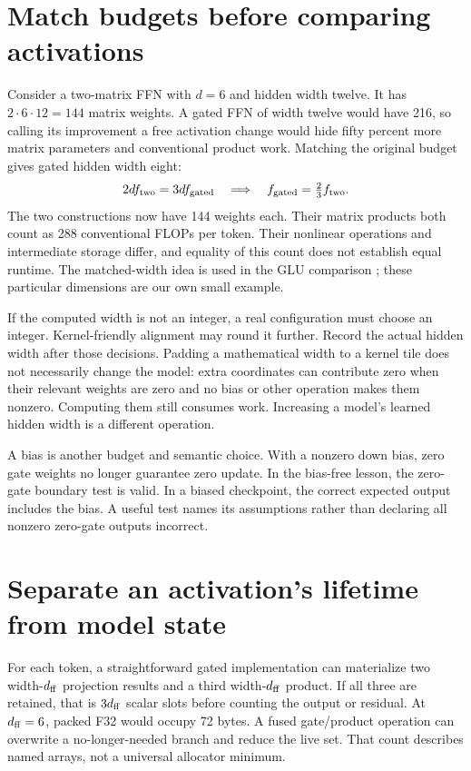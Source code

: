 \section{Match budgets before comparing activations}
Consider a two-matrix FFN with $d=6$ and hidden width twelve. It has
$2\cdot6\cdot12=144$ matrix weights. A gated FFN of width twelve
would have 216, so calling its improvement a free activation change would
hide fifty percent more matrix parameters and conventional product work.
Matching the original budget gives gated hidden width eight:
\[
 2d f_{\rm two}=3d f_{\rm gated}
 \quad\Longrightarrow\quad
 f_{\rm gated}=\tfrac23 f_{\rm two}.
\]
The two constructions now have 144 weights each. Their matrix products
both count as 288 conventional FLOPs per token. Their nonlinear
operations and intermediate storage differ, and equality of this count
does not establish equal runtime. The matched-width idea is used in the
GLU comparison \cite{shazeer2020glu}; these particular dimensions are
our own small example.

If the computed width is not an integer, a real configuration must choose
an integer. Kernel-friendly alignment may round it further. Record the
actual hidden width after those decisions. Padding a mathematical width
to a kernel tile does not necessarily change the model: extra coordinates
can contribute zero when their relevant weights are zero and no bias or
other operation makes them nonzero. Computing them still consumes work.
Increasing a model's learned hidden width is a different operation.

A bias is another budget and semantic choice. With a nonzero down bias,
zero gate weights no longer guarantee zero update. In the bias-free
lesson, the zero-gate boundary test is valid. In a biased checkpoint,
the correct expected output includes the bias. A useful test names its
assumptions rather than declaring all nonzero zero-gate outputs incorrect.

\section{Separate an activation's lifetime from model state}
For each token, a straightforward gated implementation can materialize
two width-$d_{\rm ff}$ projection results and a third width-$d_{\rm ff}$
product. If all three are retained, that is $3d_{\rm ff}$ scalar
slots before counting the output or residual. At $d_{\rm ff}=6$,
packed F32 would occupy 72 bytes. A fused gate/product operation can
overwrite a no-longer-needed branch and reduce the live set.
That count describes named arrays, not a universal allocator minimum.

